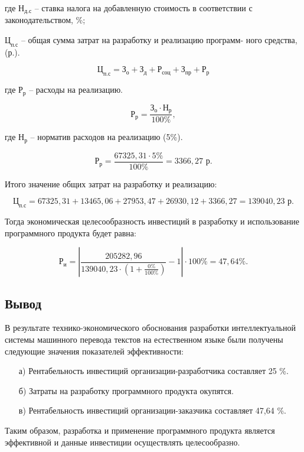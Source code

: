 где $\text{Н}_{\text{д.с}}$ -- ставка налога на добавленную стоимость в соответствии с законодательством, {\%};

$\text{Ц}_{\text{п.с}}$ -- общая сумма затрат на разработку и реализацию программ-
ного средства, (р.).

$$
 \text{Ц}_{\text{п.с}} =\text{З}_{\text{о}} + \text{З}_{\text{д}} + \text{Р}_{\text{соц}} + \text{З}_{\text{пр}} + \text{Р}_{\text{р}}
$$

где $\text{Р}_{\text{р}}$ -- расходы на реализацию.

\begin{equation}
    \text{Р}_{\text{р}} = \frac{\text{З}_{\text{о}} \cdot \text{Н}_{\text{р}}}{100\%},
\end{equation}

где $\text{Н}_{\text{р}}$ -- норматив расходов на реализацию (5\%).

\begin{equation}
    \text{Р}_{\text{р}} = \frac{67325,31 \cdot 5\%}{100\%} = 3366,27 \text{ р}.
\end{equation}

Итого значение общих затрат на разработку и реализацию:

$$
 \text{Ц}_{\text{п.с}} = 67325,31+13465,06+27953,47+26930,12+3366,27 = 139040,23 \text{ р}.
$$


Тогда экономическая целесообразность инвестиций в разработку и использование программного продукта будет равна:

\begin{equation}
    \text{Р}_{\text{и}} = |\frac{205282, 96}{139040,23 \cdot (1 + \frac{0\%}{100\%})} - 1| \cdot 100\% = 47, 64 \%.
\end{equation}


\newpage

\subsection{Вывод}

В результате технико-экономического обоснования разработки интеллектуальной системы машинного перевода текстов на естественном языке были получены следующие значения показателей эффективности:

\begin{enumerate}
\item[а)] Рентабельность инвестиций организации-разработчика составляет
25 \%.
\item[б)] Затраты на разработку программного продукта окупятся.
\item[в)] Рентабельность инвестиций организации-заказчика составляет
47,64 \%.
\end{enumerate}

Таким образом, разработка и применение программного продукта является эффективной и данные инвестиции осуществлять целесообразно.